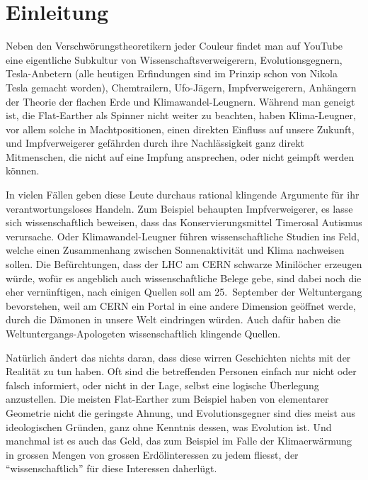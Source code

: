 %
%
%
\chapter*{Einleitung}
\label{chapter:einleitung}
Neben den Verschwörungstheoretikern jeder Couleur findet man
auf YouTube eine eigentliche Subkultur von Wissenschaftsverweigerern,
Evolutionsgegnern, Tesla-Anbetern (alle heutigen Erfindungen sind im
Prinzip schon von Nikola Tesla gemacht worden), Chemtrailern, 
Ufo-Jägern,
Impfverweigerern, Anhängern der Theorie der flachen Erde
und Klimawandel-Leugnern.
Während man geneigt ist, die Flat-Earther als Spinner nicht weiter
zu beachten, haben Klima-Leugner, vor allem solche in Machtpositionen,
einen direkten Einfluss auf unsere Zukunft, und Impfverweigerer
gefährden durch ihre Nachlässigkeit ganz direkt Mitmenschen, die
nicht auf eine Impfung ansprechen, oder nicht geimpft werden
können.

In vielen Fällen geben diese Leute durchaus rational klingende
Argumente für ihr verantwortungsloses Handeln.
Zum Beispiel behaupten Impfverweigerer, es lasse sich wissenschaftlich
beweisen, dass das Konservierungsmittel Timerosal Autismus verursache.
Oder Klimawandel-Leugner führen wissenschaftliche Studien ins Feld,
welche einen Zusammenhang zwischen Sonnenaktivität und Klima 
nachweisen sollen.
Die Befürchtungen, dass der LHC am CERN schwarze Minilöcher erzeugen
würde, wofür es angeblich auch wissenschaftliche Belege gebe,
sind dabei noch die eher vernünftigen, nach einigen Quellen soll
am 25.~September der Weltuntergang bevorstehen, weil am CERN ein
Portal in eine andere Dimension geöffnet werde, durch die Dämonen
in unsere Welt eindringen würden.
Auch dafür haben die Weltuntergangs-Apologeten wissenschaftlich
klingende Quellen.

Natürlich ändert das nichts daran, dass diese wirren Geschichten
nichts mit der Realität zu tun haben.
Oft sind die betreffenden Personen einfach nur nicht oder falsch
informiert, oder nicht in der Lage, selbst eine logische Überlegung
anzustellen.
Die meisten Flat-Earther zum Beispiel haben von elementarer Geometrie
nicht die geringste Ahnung, und Evolutionsgegner sind dies meist aus
ideologischen Gründen, ganz ohne Kenntnis dessen, was Evolution ist.
Und manchmal ist es auch das Geld, das zum Beispiel im Falle der 
Klimaerwärmung in grossen Mengen von grossen Erdölinteressen zu
jedem fliesst, der ``wissenschaftlich'' für diese Interessen
daherlügt.

